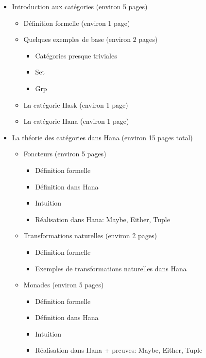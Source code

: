 \documentclass{article}
\begin{document}
\begin{itemize}
    \item Introduction aux catégories (environ 5 pages)
    \begin{itemize}
        \item Définition formelle (environ 1 page)
        \item Quelques exemples de base (environ 2 pages)
            \begin{itemize}
                \item Catégories presque triviales
                \item Set
                \item Grp
            \end{itemize}
        \item La catégorie Hask (environ 1 page)
        \item La catégorie Hana (environ 1 page)
    \end{itemize}

    \item La théorie des catégories dans Hana (environ 15 pages total)
    \begin{itemize}
        \item Foncteurs (environ 5 pages)
        \begin{itemize}
            \item Définition formelle
            \item Définition dans Hana
            \item Intuition
            \item Réalisation dans Hana: Maybe, Either, Tuple
        \end{itemize}

        \item Transformations naturelles (environ 2 pages)
        \begin{itemize}
            \item Définition formelle
            \item Exemples de transformations naturelles dans Hana
        \end{itemize}

        \item Monades (environ 5 pages)
        \begin{itemize}
            \item Définition formelle
            \item Définition dans Hana
            \item Intuition
            \item Réalisation dans Hana + preuves: Maybe, Either, Tuple
        \end{itemize}


\end{itemize}
\end{itemize}
\end{document}
